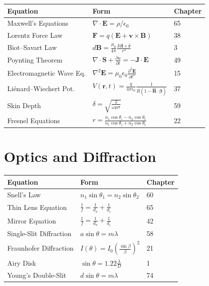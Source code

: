 \begin{center}
\begin{tabular}{lll}
\hline
\textbf{Equation} & \textbf{Form} & \textbf{Chapter} \\
\hline
Maxwell's Equations & $\nabla \cdot \mathbf{E} = \rho/\epsilon_0$ & 65 \\
Lorentz Force Law & $\mathbf{F} = q(\mathbf{E} + \mathbf{v} \times \mathbf{B})$ & 38 \\
Biot--Savart Law & $d\mathbf{B} = \frac{\mu_0}{4\pi}\frac{I d\mathbf{l} \times \mathbf{\hat{r}}}{r^2}$ & 3 \\
Poynting Theorem & $\nabla \cdot \mathbf{S} + \frac{\partial u}{\partial t} = -\mathbf{J} \cdot \mathbf{E}$ & 49 \\
Electromagnetic Wave Eq. & $\nabla^2 \mathbf{E} = \mu_0 \epsilon_0 \frac{\partial^2 \mathbf{E}}{\partial t^2}$ & 15 \\
Li\'enard--Wiechert Pot. & $V(\mathbf{r}, t) = \frac{q}{4\pi\epsilon_0}\frac{1}{R(1 - \mathbf{\hat{R}}\cdot\boldsymbol{\beta})}$ & 37 \\
Skin Depth & $\delta = \sqrt{\frac{2}{\omega \mu \sigma}}$ & 59 \\
Fresnel Equations & $r = \frac{n_1 \cos\theta_i - n_2 \cos\theta_t}{n_1 \cos\theta_i + n_2 \cos\theta_t}$ & 22 \\
\hline
\end{tabular}
\end{center}

\section*{Optics and Diffraction}

\begin{center}
\begin{tabular}{lll}
\hline
\textbf{Equation} & \textbf{Form} & \textbf{Chapter} \\
\hline
Snell's Law & $n_1 \sin\theta_1 = n_2 \sin\theta_2$ & 60 \\
Thin Lens Equation & $\frac{1}{f} = \frac{1}{d_o} + \frac{1}{d_i}$ & 65 \\
Mirror Equation & $\frac{1}{f} = \frac{1}{d_o} + \frac{1}{d_i}$ & 42 \\
Single-Slit Diffraction & $a \sin\theta = m\lambda$ & 58 \\
Fraunhofer Diffraction & $I(\theta) = I_0 \left(\frac{\sin\beta}{\beta}\right)^2$ & 21 \\
Airy Disk & $\sin\theta = 1.22\frac{\lambda}{D}$ & 1 \\
Young's Double-Slit & $d \sin\theta = m\lambda$ & 74 \\
\hline
\end{tabular}
\end{center}

